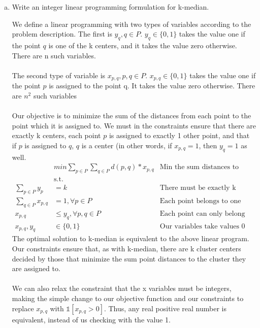 \documentclass[11pt]{article}
\begin{document}



\begin{enumerate}[(a)]
    \item Write an integer linear programming formulation for k-median.
    \begin{solution}
We define a linear programming with two types of variables according to the problem description. The first is $y_q, q\in P$. $y_q \in \{0,1\}$ takes the value one if the point $q$ is one of the k centers, and it takes the value zero otherwise. There are n such variables. \\ \\
The second type of variable is $x_{p,q}, p,q \in P$. $x_{p,q} \in \{0,1\}$ takes the value one if the point $p$ is assigned to the point q. It takes the value zero otherwise. There are $n^2$ such variables \\ \\
Our objective is to minimize the sum of the distances from each point to the point which it is assigned to. We must in the constraints ensure that there are exactly k centers, each point $p$ is assigned to exactly 1 other point, and that if $p$ is assigned to $q$, $q$ is a center (in other words, if $x_{p,q}=1$, then $y_q=1$ as well. 
\begin{align*}
& min \sum_{p \in P} \sum_{q \in P} d(p,q)* x_{p,q} & \text{Min the sum distances to cluster centers}\\
& \text{s.t.  } \\
\sum_{p \in P} y_p &= k  & \text{There must be exactly k centers}\\
\sum_{q \in P} x_{p,q} &= 1, \forall p \in P & \text{Each point belongs to one center} \\
x_{p,q} &\leq y_q, \forall p,q \in P & \text{Each point can only belong to a center} \\
x_{p,q}, y_q &\in \{0,1\} & \text{Our variables take values 0 or 1}
\end{align*}
The optimal solution to k-median is equivalent to the above linear program. Our constraints ensure that, as with k-median, there are k cluster centers decided by those that minimize the sum point distances to the cluster they are assigned to. \\ \\
We can also relax the constraint that the x variables must be integers, making the simple change to our objective function and our constraints to replace $x_{p,q}$ with  $\mathbb{1}[x_{p,q} > 0]$. Thus, any real positive real number is equivalent, instead of us checking with the value 1.

\end{solution}
\end{enumerate}
\end{document}
